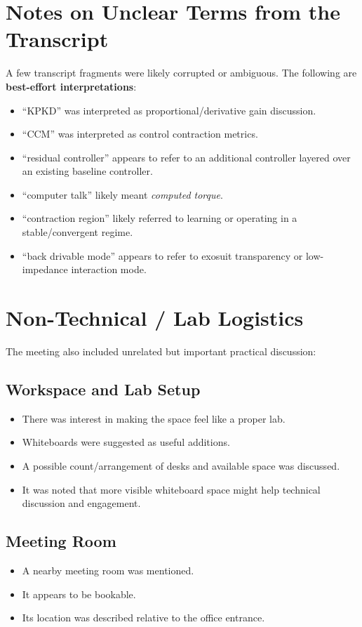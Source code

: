\documentclass[11pt]{article}
\begin{document}
\section{Notes on Unclear Terms from the Transcript}
A few transcript fragments were likely corrupted or ambiguous. The following are \textbf{best-effort interpretations}:

\begin{itemize}[leftmargin=1.5em]
    \item ``KPKD'' was interpreted as proportional/derivative gain discussion.
    \item ``CCM'' was interpreted as control contraction metrics.
    \item ``residual controller'' appears to refer to an additional controller layered over an existing baseline controller.
    \item ``computer talk'' likely meant \emph{computed torque}.
    \item ``contraction region'' likely referred to learning or operating in a stable/convergent regime.
    \item ``back drivable mode'' appears to refer to exosuit transparency or low-impedance interaction mode.
\end{itemize}

\section{Non-Technical / Lab Logistics}
The meeting also included unrelated but important practical discussion:

\subsection{Workspace and Lab Setup}
\begin{itemize}[leftmargin=1.5em]
    \item There was interest in making the space feel like a proper lab.
    \item Whiteboards were suggested as useful additions.
    \item A possible count/arrangement of desks and available space was discussed.
    \item It was noted that more visible whiteboard space might help technical discussion and engagement.
\end{itemize}

\subsection{Meeting Room}
\begin{itemize}[leftmargin=1.5em]
    \item A nearby meeting room was mentioned.
    \item It appears to be bookable.
    \item Its location was described relative to the office entrance.
\end{itemize}
\end{document}
